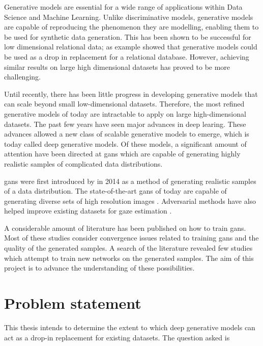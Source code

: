 

Generative models are essential for a wide range of applications within Data Science and Machine Learning. Unlike discriminative models, generative models are capable of reproducing the phenomenon they are modelling, enabling them to be used for synthetic data generation. This has been shown to be successful for low dimensional relational data; as example \textcite{patki2016synthetic} showed that generative models could be used as a drop in replacement for a relational database. However, achieving similar results on large high dimensional datasets has proved to be more challenging.

Until recently, there has been little progress in developing generative models that can scale beyond small low-dimensional datasets. Therefore, the most refined generative models of today are intractable to apply on large high-dimensional datasets. The past few years have seen major advances in deep learing. These advances allowed a new class of scalable generative models to emerge, which is today called deep generative models. Of these models, a significant amount of attention have been directed at \acrfull{gans} which are capable of generating highly realistic samples of complicated data distributions.

\acrlong{gans} were first introduced by \textcite{goodfellow2014generative} in 2014 as a method of generating realistic samples of a data distribution. The state-of-the-art \acrshort{gans} of today are capable of generating diverse sets of high resolution images \cite{karras2017progressive}. Adversarial methods have also helped improve existing datasets for gaze estimation \cite{shrivastava2016learning,sela2017gazegan}. 

A considerable amount of literature has been published on how to train \acrshort{gans}. Most of these studies consider convergence issues related to training \acrshort{gans} and the quality of the generated samples. A search of the literature revealed few studies which attempt to train new networks on the generated samples. The aim of this project is to advance the understanding of these possibilities.

\section{Problem statement}
This thesis intends to determine the extent to which deep generative models can act as a drop-in replacement for existing datasets. The question asked is

